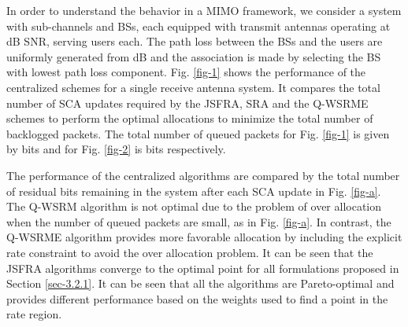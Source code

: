 In order to understand the behavior in a \ac{MIMO} framework, we consider a system with  sub-channels and  \acp{BS}, each equipped with  transmit antennas operating at dB \ac{SNR}, serving  users each. The path loss between the \acp{BS} and the users are uniformly generated from \me{[0,-3]} dB and the association is made by selecting the \ac{BS} with lowest path loss component. Fig. \ref{fig-1} shows the performance of the centralized schemes for a single receive antenna system. It compares the total number of \ac{SCA} updates required by the \ac{JSFRA}, \ac{SRA} and the \ac{Q-WSRME} schemes to perform the optimal allocations to minimize the total number of backlogged packets. The total number of queued packets for Fig. \ref{fig-1} is given by  bits and for Fig. \ref{fig-2} is  bits respectively.
\begin{figure*}
\centering
{}
\hfill
{}
\caption{Number of backlogged packets at the \ac{SCA} update points}
\label{fig-a}
\end{figure*}

The performance of the centralized algorithms are compared by the total number of residual bits remaining in the system after each \ac{SCA} update in Fig. \ref{fig-a}. The \ac{Q-WSRM} algorithm is not optimal due to the problem of over allocation when the number of queued packets are small, as in Fig. \ref{fig-a}. In contrast, the \ac{Q-WSRME} algorithm provides more favorable allocation by including the explicit rate constraint to avoid the over allocation problem. It can be seen that the \ac{JSFRA} algorithms converge to the optimal point for all formulations proposed in Section \ref{sec-3.2.1}. It can be seen that all the algorithms are Pareto-optimal and provides different performance based on the weights used to find a point in the rate region. 

